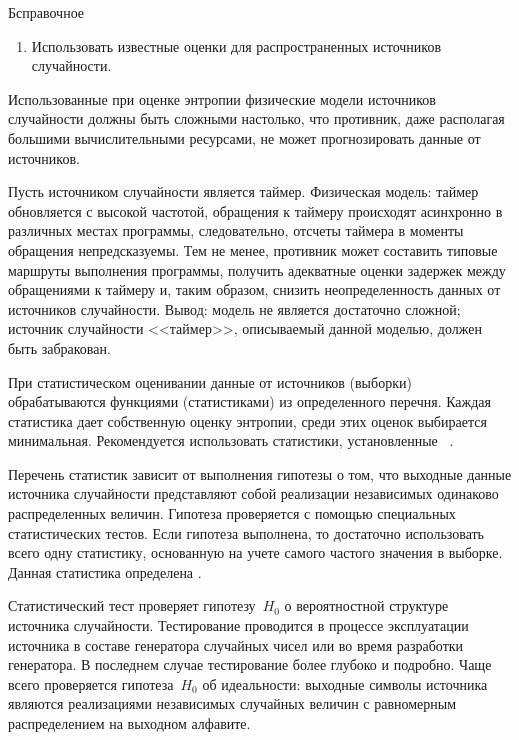 \begin{appendix}{Б}{справочное}
\begin{enumerate}
\begin{example*}
В проведенных экспериментах величина $h^*$ была не меньше $27,1$.
%
Нижняя граница достигалась для процессоров 
с минимально допустимой тактовой частотой $600$~МГц.
\end{example*}

\item 
Использовать известные оценки для распространенных источников случайности.
\end{enumerate}

Использованные при оценке энтропии физические модели источников случайности 
должны быть сложными настолько, что противник, даже располагая большими 
вычислительными ресурсами, не может прогнозировать данные от источников. 

\begin{example}
Пусть источником случайности является таймер. 
Физическая модель: таймер обновляется с высокой частотой, обращения к 
таймеру происходят асинхронно в различных местах программы, 
следовательно, отсчеты таймера в моменты обращения непредсказуемы. 
Тем не менее, противник может составить типовые маршруты выполнения 
программы, получить адекватные оценки задержек между обращениями к 
таймеру и, таким образом, снизить неопределенность данных от 
источников случайности. Вывод: модель не является достаточно сложной; 
источник случайности <<таймер>>, описываемый данной моделью, должен быть 
забракован.
\end{example}

При статистическом оценивании данные от источников (выборки)
обрабатываются функциями (статистиками) из определенного перечня. 
Каждая статистика дает собственную оценку энтропии, среди этих оценок 
выбирается минимальная. Рекомендуется использовать статистики, установленные 
~\cite{SP800-90B}.  

Перечень статистик зависит от выполнения гипотезы о том, что выходные 
данные источника случайности представляют собой реализации 
независимых одинаково распределенных величин. Гипотеза проверяется 
с помощью специальных статистических тестов.
%
Если гипотеза выполнена, то достаточно использовать всего одну статистику,
основанную на учете самого частого значения в выборке. Данная статистика определена 
.

\label{RNG.StatTest}

Статистический тест проверяет гипотезу~$H_0$ о вероятностной структуре 
источника случайности.
%
Тестирование проводится в процессе эксплуатации источника в составе 
генератора случайных чисел или во время разработки генератора.
%
В последнем случае тестирование  более глубоко и подробно. 
%
Чаще всего проверяется гипотеза~$H_0$ об идеальности:
выходные символы источника являются реализациями независимых случайных величин  
с равномерным распределением на выходном алфавите.


\end{appendix}
